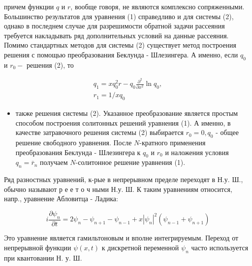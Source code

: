 \documentclass[10pt]{article}
\begin{document}
причем функции $q$ и $r$, вообще говоря, не являются комплексно сопряженными. Большинство результатов для уравнения (1) справедливо и для системы (2), однако в последнем случае для разрешимости обратной задачи рассеяния требуется накладывать ряд дополнительных условий на данные рассеяния. Помимо стандартных методов для системы (2) существует метод построения решения с помощью преобразования Беклунда - Шлезингера. А именно, если $q_{0}$ и $r_{0}-$ решения (2), то



\[

\begin{gathered}

q_{1}=x q_{0}^{2} r-q_{0} \frac{\partial^{2}}{\partial x^{2}} \ln q_{0}, \\

r_{1}=1 / x q_{0}

\end{gathered}

\]



\begin{itemize}

  \item также решения системы (2). Указанное преобразование является простым способом построения солитонных решений уравнения (1). А именно, в качестве затравочного решения системы (2) выбирается $r_{0}=0, q_{0}$ - общее решение свободного уравнения. После $N$-кратного применения преобразования Беклунда - Шлезингера к $q_{0}$ и $r_{0}$ и наложения условия $q_{n}=\bar{r}_{n}$ получаем $N$-солитонное решение уравнения (1).

\end{itemize}



Ряд разностных уравнений, к-рые в непрерывном пределе переходят в Н.у. Ш., обычно называют р е е т о ч ными Н.у. Ш. К таким уравнениям относится, напр., уравнение Абловитца - Ладика:



\[

i \frac{\partial \psi_{n}}{\partial t}=2 \psi_{n}-\psi_{n+1}-\psi_{n-1}+x\left|\psi_{n}\right|^{2}\left(\psi_{n-1}+\psi_{n+1}\right)

\]



Это уравнение является гамильтоновым и вполне интегрируемым. Переход от непрерывной функции $\psi(x, t)$ к дискретной переменной $\psi_{n}$ часто используется при квантовании Н. у. Ш.
\end{document}
